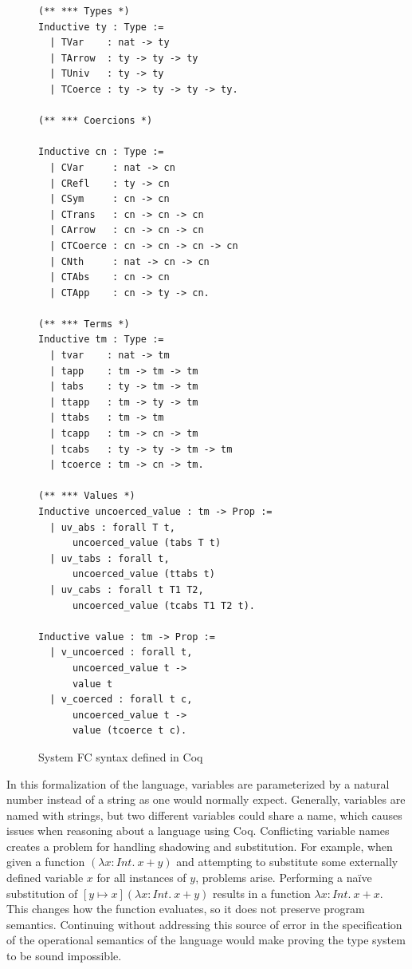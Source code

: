\documentclass{sig-alternate}
\begin{document}
\begin{figure}[h!]
\begin{lstlisting}
(** *** Types *)
Inductive ty : Type := 
  | TVar    : nat -> ty 
  | TArrow  : ty -> ty -> ty
  | TUniv   : ty -> ty
  | TCoerce : ty -> ty -> ty -> ty.

(** *** Coercions *)

Inductive cn : Type :=
  | CVar     : nat -> cn
  | CRefl    : ty -> cn
  | CSym     : cn -> cn
  | CTrans   : cn -> cn -> cn
  | CArrow   : cn -> cn -> cn
  | CTCoerce : cn -> cn -> cn -> cn
  | CNth     : nat -> cn -> cn
  | CTAbs    : cn -> cn
  | CTApp    : cn -> ty -> cn.

(** *** Terms *)
Inductive tm : Type :=
  | tvar    : nat -> tm
  | tapp    : tm -> tm -> tm
  | tabs    : ty -> tm -> tm
  | ttapp   : tm -> ty -> tm
  | ttabs   : tm -> tm
  | tcapp   : tm -> cn -> tm
  | tcabs   : ty -> ty -> tm -> tm
  | tcoerce : tm -> cn -> tm.

(** *** Values *)
Inductive uncoerced_value : tm -> Prop :=
  | uv_abs : forall T t,
      uncoerced_value (tabs T t)
  | uv_tabs : forall t,
      uncoerced_value (ttabs t)
  | uv_cabs : forall t T1 T2,
      uncoerced_value (tcabs T1 T2 t).

Inductive value : tm -> Prop :=
  | v_uncoerced : forall t,
      uncoerced_value t ->
      value t
  | v_coerced : forall t c,
      uncoerced_value t ->
      value (tcoerce t c).

\end{lstlisting}
\caption{System FC syntax defined in Coq}
\label{fig:syntax-coq}
\end{figure}

In this formalization of the language, variables are parameterized by a natural number instead of a string as one would normally expect. Generally, variables are named with strings, but two different variables could share a name, which causes issues when reasoning about a language using Coq. Conflicting variable names creates a problem for handling shadowing and substitution. For example, when given a function $(\lambda x:Int.\:x + y)$ and attempting to substitute some externally defined variable $x$ for all instances of $y$, problems arise. Performing a na\"ive substitution of $[y \mapsto x] (\lambda x:Int.\:x + y)$ results in a function $\lambda x:Int.\:x + x$. This changes how the function evaluates, so it does not preserve program semantics. Continuing without addressing this source of error in the specification of the operational semantics of the language would make proving the type system to be sound impossible.
\end{document}
